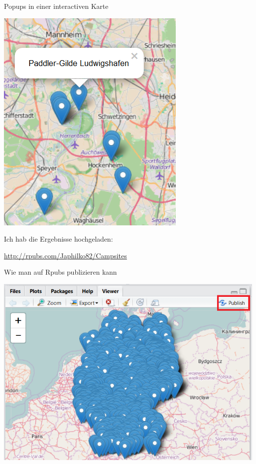 \documentclass[ignorenonframetext,]{beamer}
\begin{document}
\begin{frame}{Popups in einer interactiven Karte}
\protect\hypertarget{popups-in-einer-interactiven-karte}{}

\includegraphics{figure/Camping_Mannheim.PNG}

Ich hab die Ergebnisse hochgeladen:

\url{http://rpubs.com/Japhilko82/Campsites}

\end{frame}

\begin{frame}{Wie man auf Rpubs publizieren kann}
\protect\hypertarget{wie-man-auf-rpubs-publizieren-kann}{}

\includegraphics{figure/PublishCampSitesGermany.PNG}

\end{frame}
\end{document}
